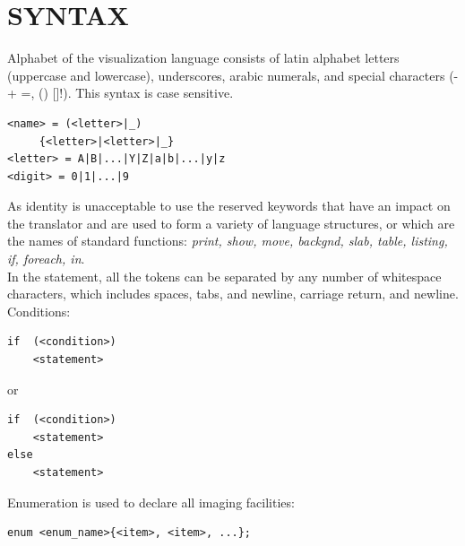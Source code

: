 \documentclass[a4paper, 10pt, conference]{ieeeconf}
\begin{document}
\section{SYNTAX}
Alphabet of the visualization language consists of latin alphabet letters (uppercase and lowercase), underscores, arabic numerals, and special characters (- + =, {} () []!). This syntax is case sensitive.\\
\begin{lstlisting}
<name> = (<letter>|_)
	 {<letter>|<letter>|_}
<letter> = A|B|...|Y|Z|a|b|...|y|z
<digit> = 0|1|...|9
\end{lstlisting}
As identity is unacceptable to use the reserved keywords that have an impact on the translator and are used to form a variety of language structures, or which are the names of standard functions:
\textit{print, show, move, backgnd, slab, table, listing, if, foreach, in}.\\
In the statement, all the tokens can be separated by any number of whitespace characters, which includes spaces, tabs, and newline, carriage return, and newline.\\
Conditions:
\begin{lstlisting}
if  (<condition>)
	<statement>
\end{lstlisting} or
\begin{lstlisting}
if  (<condition>)
	<statement>
else
	<statement>
\end{lstlisting}
Enumeration is used to declare all imaging facilities:
\begin{lstlisting}
enum <enum_name>{<item>, <item>, ...};
\end{lstlisting}
\end{document}

